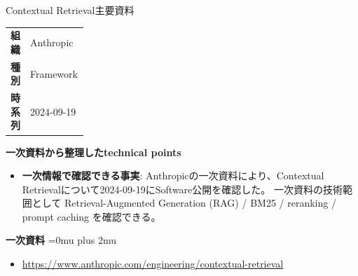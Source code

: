 \begin{technicalnote}{Contextual Retrieval}{主要資料}
\begingroup
\begin{tabularx}{\linewidth}{@{}>{\bfseries}p{0.22\linewidth}X@{}}
組織 & Anthropic \\
種別 & Framework \\
時系列 & 2024-09-19 \\
\end{tabularx}
\smallskip
{\bfseries 一次資料から整理したtechnical points}
\begin{itemize}[leftmargin=1.5em,itemsep=0.35em]
\item \textbf{一次情報で確認できる事実}: Anthropicの一次資料により、Contextual Retrievalについて2024-09-19にSoftware公開を確認した。 一次資料の技術範囲として Retrieval-Augmented Generation (RAG) / BM25 / reranking / prompt caching を確認できる。
\end{itemize}
\begin{minipage}{\linewidth}
\begin{samepage}
{\bfseries 一次資料}
\begingroup\sloppy
\Urlmuskip=0mu plus 2mu\relax
\begin{itemize}[leftmargin=1.5em,itemsep=0.25em]
\item {\scriptsize\url{https://www.anthropic.com/engineering/contextual-retrieval}}
\end{itemize}
\endgroup
\end{samepage}
\end{minipage}
\endgroup
\end{technicalnote}
\medskip

